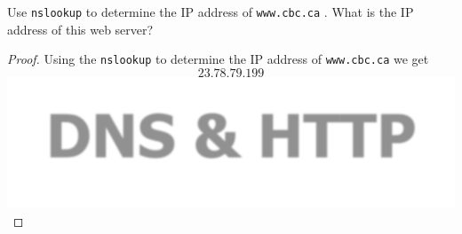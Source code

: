 \documentclass[../../main.tex]{subfiles}
\begin{document}
\begin{wts}
Use \lstinline{nslookup} to determine the IP address of \lstinline{www.cbc.ca} . What is the IP address of this web server?
\end{wts}
\begin{proof}
Using the \lstinline{nslookup} to determine the IP address of  \lstinline{www.cbc.ca} we get\[23.78.79.199\]
\includegraphics[width=\textwidth]{subfiles/images/L5_Manual/L5N2_ DNS & HTTP_PAGE0_1_Image11.png}

\end{proof}
\end{document}
